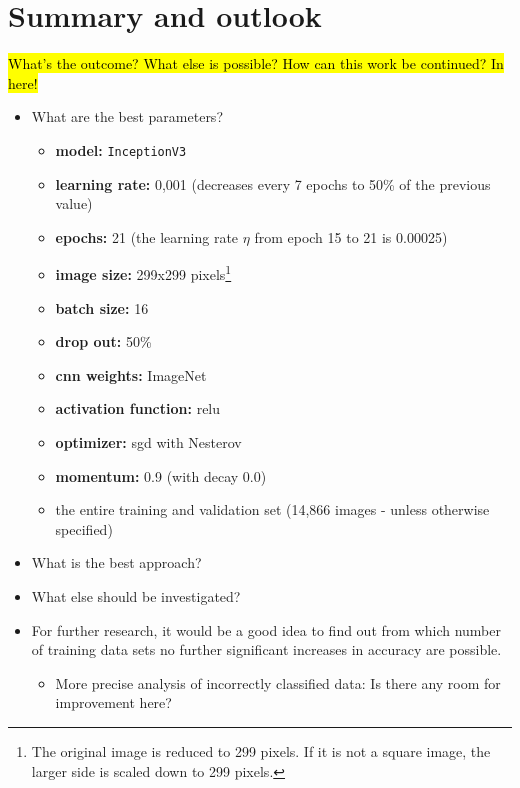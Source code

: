 \documentclass[10pt]{article}
\begin{document}
	\pagebreak
	\section{Summary and outlook}
		\hl{What's the outcome? What else is possible? How can this work be continued? In here!}
		
		\begin{itemize}
			\setlength\itemsep{0em}
			\item What are the best parameters?
					\begin{itemize}
						\setlength\itemsep{0em}
						\item \textbf{model:} \texttt{InceptionV3}
						\item \textbf{learning rate:} 0,001 (decreases every 7 epochs to 50\% of the previous value)
						\item \textbf{epochs:} 21 (the learning rate \(\eta\) from epoch 15 to 21 is 0.00025)
						\item \textbf{image size:} 299x299 pixels\footnote{The original image is reduced to 299 pixels. If it is not a square image, the larger side is scaled down to 299 pixels.}
						\item \textbf{batch size:} 16
						\item \textbf{drop out:} 50\%
						\item \textbf{\ac{cnn} weights:} ImageNet
						\item \textbf{activation function:} \ac{relu}
						\item \textbf{optimizer:} \ac{sgd} with Nesterov
						\item \textbf{momentum:} 0.9 (with decay 0.0)
						\item the entire training and validation set (14,866 images - unless otherwise specified)
					\end{itemize}
			\item What is the best approach?
			\item What else should be investigated?
			\item For further research, it would be a good idea to find out from which number of training data sets no further significant increases in accuracy are possible.
			\begin{itemize}
				\setlength\itemsep{0em}
				\item More precise analysis of incorrectly classified data: Is there any room for improvement here?
			\end{itemize}

\end{itemize}
\end{document}
